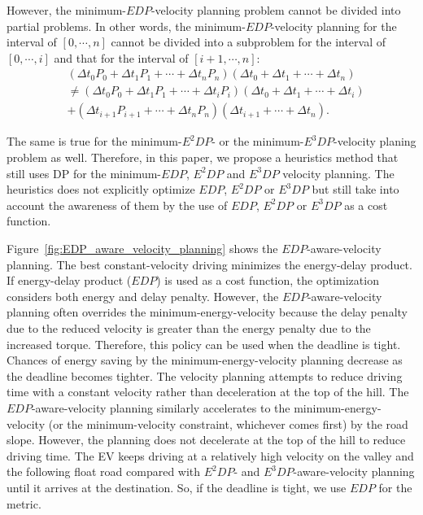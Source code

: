 \documentclass{IEEEtran}
\begin{document}
However, the minimum-$EDP$-velocity planning problem cannot be divided into partial problems. In other words, the minimum-$EDP$-velocity planning for the interval of $[0, \cdots, n]$ cannot be divided into a subproblem for the interval of $[0, \cdots,  i]$ and that for the interval of $[i+1,\cdots, n]$:
%
\begin{align}
&(\Delta t_0 P_0 + \Delta t_1 P_1 + \cdots + \Delta t_n P_n)(\Delta t_0 + \Delta t_1 + \cdots + \Delta t_n) \nonumber \\ 
&\neq (\Delta t_0 P_0 + \Delta t_1 P_1 + \cdots + \Delta t_i P_i)(\Delta t_0 + \Delta t_1 + \cdots + \Delta t_i) \nonumber \\
&+ (\Delta t_{i+1} P_{i+1} + \cdots + \Delta t_n P_n)(\Delta t_{i+1} + \cdots + \Delta t_n).
\end{align} 

The same is true for the minimum-$E^2DP$- or the minimum-$E^3DP$-velocity planing problem as well. Therefore, in this paper, we propose a heuristics method that still uses DP for the minimum-$EDP$, $E^2DP$ and $E^3DP$ velocity planning. The heuristics does not explicitly optimize $EDP$, $E^2DP$ or $E^3DP$ but still take into account the awareness of them by the use of $EDP$, $E^2DP$ or $E^3DP$ as a cost function. 

Figure~\ref{fig:EDP_aware_velocity_planning} shows the $EDP$-aware-velocity planning. The best constant-velocity driving minimizes the energy-delay product.
If energy-delay product ($EDP$) is used as a cost function, the optimization considers both energy and delay penalty. However, the $EDP$-aware-velocity planning often overrides the minimum-energy-velocity because the delay penalty due to the reduced velocity is greater than the energy penalty due to the increased torque. Therefore, this policy can be used when the deadline is tight. Chances of energy saving by the minimum-energy-velocity planning decrease as the deadline becomes tighter. 
The velocity planning attempts to reduce driving time with a constant velocity rather than deceleration at the top of the hill. 
%
The $EDP$-aware-velocity planning similarly accelerates to the minimum-energy-velocity (or the minimum-velocity constraint, whichever comes first) by the road slope. However, the planning does not decelerate at the top of the hill to reduce driving time. 
The EV keeps driving at a relatively high velocity on the valley and the following float road compared with $E^2DP$- and $E^3DP$-aware-velocity planning until it arrives at the destination. So, if the deadline is tight, we use $EDP$ for the metric.
\end{document}
